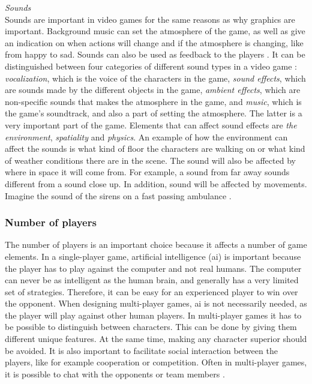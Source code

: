 \emph{Sounds}\\
Sounds are important in video games for the same reasons as why graphics are important. Background music can set the atmosphere of the game, as well as give an indication on when actions will change and if the atmosphere is changing, like from happy to sad. Sounds can also be used as feedback to the players \cite{umlapproach}. It can be distinguished between four categories of different sound types in a video game \cite{understandingvg}:
\emph{vocalization}, which is the voice of the characters in the game,
\emph{sound effects}, which are sounds made by the different objects in the game, \emph{ambient effects}, which are non-specific sounds that makes the atmosphere in the game, and \emph{music}, which is the game's soundtrack, and also a part of setting the atmosphere. The latter is a very important part of the game. Elements that can affect sound effects are \emph{the environment}, \emph{spatiality} and \emph{physics}. An example of how the environment can affect the sounds is what kind of floor the characters are walking on or what kind of weather conditions there are in the scene. The sound will also be affected by where in space it will come from. For example, a sound from far away sounds different from a sound close up. In addition, sound will be affected by movements. Imagine the sound of the sirens on a fast passing ambulance \cite{understandingvg}.

\subsubsection{Number of players}
\label{subsec:numbers}
The number of players is an important choice because it affects a number of game elements. In a single-player game, artificial intelligence (\ac{ai}) is important because the player has to play against the computer and not real humans. The computer can never be as intelligent as the human brain, and generally has a very limited set of strategies. Therefore, it can be easy for an experienced player to win over the opponent. When designing multi-player games, \ac{ai} is not necessarily needed, as the player will play against other human players. In multi-player games it has to be possible to distinguish between characters. This can be done by giving them different unique features. At the same time, making any character superior should be avoided. It is also important to facilitate social interaction between the players, like for example cooperation or competition. Often in multi-player games, it is possible to chat with the opponents or team members \cite{understandingvg}. 

